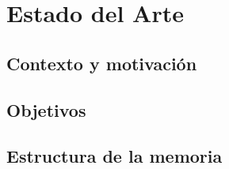 \chapter{Estado del Arte}
\label{CAP:Titulo1}



\section{Contexto y motivación}
\label{C1:Contexto y motivación}



\section{Objetivos}
\label{C1:Objetivos} 


\section{Estructura de la memoria}
\label{C1:Estructura de la memoria} 



